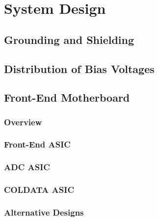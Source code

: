 \section{System Design}
\label{sec:fdsp-tpcelec-design}

\subsection{Grounding and Shielding}
\label{sec:fdsp-tpcelec-design-grounding}

\subsection{Distribution of Bias Voltages}
\label{sec:fdsp-tpcelec-design-bias}

\subsection{Front-End Motherboard}
\label{sec:fdsp-tpcelec-design-femb}

\subsubsection{Overview}
\label{sec:fdsp-tpcelec-design-femb-overview}

\subsubsection{Front-End ASIC}
\label{sec:fdsp-tpcelec-design-femb-fe}

\subsubsection{ADC ASIC}
\label{sec:fdsp-tpcelec-design-femb-adc}

\subsubsection{COLDATA ASIC}
\label{sec:fdsp-tpcelec-design-femb-coldata}

\subsubsection{Alternative Designs}
\label{sec:fdsp-tpcelec-design-femb-alt}


